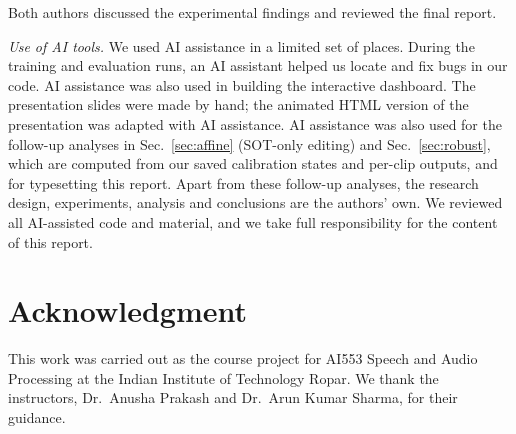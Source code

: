 \documentclass[conference,a4paper]{IEEEtran}
\begin{document}
Both authors discussed the experimental findings and reviewed the final report.

\emph{Use of AI tools.} We used AI assistance in a limited set of places. During the training and evaluation runs, an AI assistant helped us locate and fix bugs in our code. AI assistance was also used in building the interactive dashboard. The presentation slides were made by hand; the animated HTML version of the presentation was adapted with AI assistance. AI assistance was also used for the follow-up analyses in Sec.~\ref{sec:affine} (SOT-only editing) and Sec.~\ref{sec:robust}, which are computed from our saved calibration states and per-clip outputs, and for typesetting this report. Apart from these follow-up analyses, the research design, experiments, analysis and conclusions are the authors' own. We reviewed all AI-assisted code and material, and we take full responsibility for the content of this report.

\section*{Acknowledgment}

This work was carried out as the course project for AI553 Speech and Audio Processing at the Indian Institute of Technology Ropar. We thank the instructors, Dr.\ Anusha Prakash and Dr.\ Arun Kumar Sharma, for their guidance.
\end{document}

